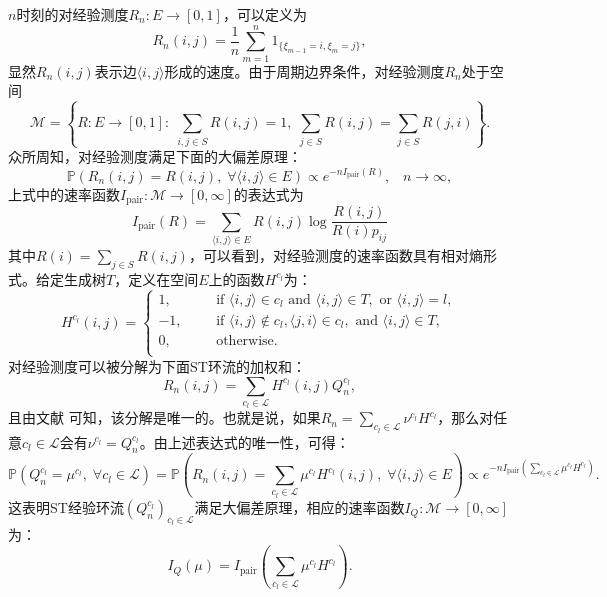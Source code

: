 $n$时刻的对经验测度$R_n:E\rightarrow[0,1]$，可以定义为
\begin{equation*}
R_n(i,j) = \frac{1}{n}\sum_{m=1}^n1_{\{\xi_{m-1}=i,\xi_m=j\}},
\end{equation*}
显然$R_n(i,j)$表示边$\langle i,j\rangle$形成的速度。由于周期边界条件，对经验测度$R_n$处于空间
\begin{equation*}
\mathcal{M} = \left\{R:E\rightarrow[0,1]:\;\sum_{i,j\in S}R(i,j) = 1,\;
\sum_{j\in S}R(i,j)=\sum_{j\in S}R(j,i)\right\}.
\end{equation*}
众所周知，对经验测度满足下面的大偏差原理：
\begin{equation*}
\mathbb{P}(R_n(i,j)=R(i,j),\;\forall\langle i,j\rangle\in E)\propto e^{-nI_{\mathrm{pair}}(R)},\;\;\;n\to\infty,
\end{equation*}
上式中的速率函数$I_{\mathrm{pair}}:\mathcal{M}\rightarrow[0,\infty]$的表达式为
\begin{equation*}
I_{\mathrm{pair}}(R) = \sum_{\langle i,j\rangle\in E}R(i,j)\log\frac{R(i,j)}{R(i)p_{ij}}
\end{equation*}
其中$R(i)=\sum_{j\in S}R(i,j)$，可以看到，对经验测度的速率函数具有相对熵形式。给定生成树$T$，定义在空间$E$上的函数$H^{c_l}$为：
\begin{equation*}\label{cycle function2}
H^{c_l}(i,j)
    =\left\{\begin{aligned}
    1, &   && \text{if } \langle i,j\rangle \in c_l \text{ and }\langle i,j\rangle \in T, \text{ or } \langle i,j\rangle=l,\\
    -1,&   && \text{if } \langle i,j\rangle\notin c_l,\langle j,i\rangle \in c_l,\text{ and }\langle i,j\rangle \in T,\\
    0, &   && \text{otherwise}.\\
    \end{aligned}\right.
\end{equation*}
对经验测度可以被分解为下面ST环流的加权和：
\begin{equation*}
R_n(i,j) = \sum_{c_l\in\mathcal{L}}H^{c_l}(i,j)Q^{c_l}_n,
\end{equation*}
且由文献 \cite{kalpazidou2007cycle}可知，该分解是唯一的。也就是说，如果$R_n =\sum_{c_l \in \mathcal{L}}\nu^{c_l}H^{c_l}$，那么对任意$c_l \in \mathcal{L}$会有$\nu^{c_l}=Q_n^{c_l}$。由上述表达式的唯一性，可得：
\begin{equation*}
    \mathbb{P}(Q_n^{c_l}=\mu^{c_l},\;\forall c_l\in\mathcal{L})
    =\mathbb{P}\left(R_n(i,j)=\sum_{c_l\in\mathcal{L}}\mu^{c_l}H^{c_l}(i,j),\;\forall\langle i,j\rangle\in E\right)
    \propto e^{-n I_{\mathrm{pair}}\left(\sum_{c_l\in\mathcal{L}}\mu^{c_l}H^{c_l}\right)}.
\end{equation*}
这表明ST经验环流$(Q_n^{c_l})_{c_l\in\mathcal{L}}$满足大偏差原理，相应的速率函数$I_Q:\mathcal{M}\rightarrow[0,\infty]$为：
\begin{equation}\label{formula:I_Q}
I_Q(\mu)=I_{\mathrm{pair}}\left(\sum_{c_l\in\mathcal{L}}\mu^{c_l}H^{c_l}\right).
\end{equation}

